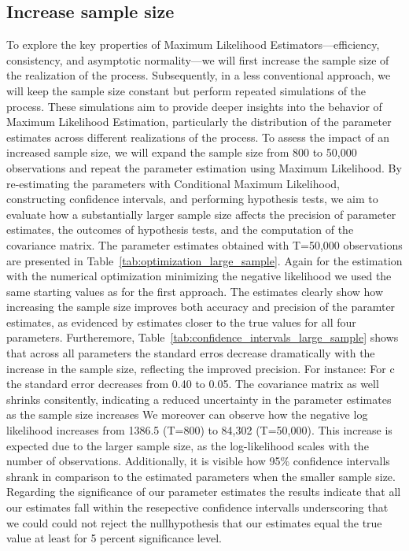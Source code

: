 \documentclass[12pt]{article}
\begin{document}
\subsection{Increase sample size}
To explore the key properties of Maximum Likelihood Estimators—efficiency, consistency, and asymptotic normality—we will first increase the sample size of the realization of the process. Subsequently, in a less conventional approach, we will keep the sample size constant but perform repeated simulations of the process. These simulations aim to provide deeper insights into the behavior of Maximum Likelihood Estimation, particularly the distribution of the parameter estimates across different realizations of the process.
To assess the impact of an increased sample size, we will expand the sample size from 800 to 50,000 observations and repeat the parameter estimation using Maximum Likelihood. By re-estimating the parameters with Conditional Maximum Likelihood, constructing confidence intervals, and performing hypothesis tests, we aim to evaluate how a substantially larger sample size affects the precision of parameter estimates, the outcomes of hypothesis tests, and the computation of the covariance matrix.
The parameter estimates obtained with T=50,000 observations are presented in Table~\ref{tab:optimization_large_sample}. Again for the estimation with the numerical optimization minimizing the negative likelihood we used the same starting values as for the first approach.
The estimates clearly show how increasing the sample size improves both accuracy and precision of the paramter estimates, as evidenced by estimates closer to the true values for all four parameters.
Furtheremore, Table~\ref{tab:confidence_intervals_large_sample} shows that across all parameters the standard erros decrease dramatically with the increase in the sample size, reflecting the improved precision.
For instance: For c the standard error decreases from 0.40 to 0.05. 
The covariance matrix as well shrinks consitently, indicating a reduced uncertainty in the parameter estimates as the sample size increases
We moreover can observe how the negative log likelihood increases from 1386.5 (T=800) to 84,302 (T=50,000). 
This increase is expected due to the larger sample size, as the log-likelihood scales with the number of observations.
Additionally, it is visible how 95\% confidence intervalls shrank in comparison to the estimated parameters when the smaller sample size.
Regarding the significance of our parameter estimates the results indicate that all our estimates fall within the resepective confidence intervalls underscoring that we could could not reject the nullhypothesis that our estimates equal the true value at least for 5 percent significance level.
\end{document}
